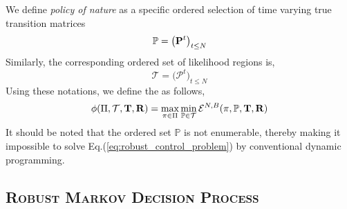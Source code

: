 We define \textit{policy of nature} as a specific ordered selection of time varying true transition matrices 
\begin{equation}
\mathbb{P} = \big( {\mathbf{P}}^t \big)_{t \leq N}
\end{equation}
Similarly, the corresponding ordered set of likelihood regions is,
\begin{equation}
\mathcal{T} = \big(\mathcal{P}^t \big)_{t \leq N}
\end{equation}
Using these notations, we define the {\robustcontrolproblem} as follows,
\begin{equation}
\label{eq:robust_control_problem}
\phi(\Pi, \mathcal{T}, {\mathbf{T}}, {\mathbf{R}}) = \max_{\pi \in \Pi} \min_{\mathbb{P} \in \mathcal{T}} \mathcal{E}^{N,B}(\pi, \mathbb{P}, {\mathbf{T}}, {\mathbf{R}}) \\
\end{equation}
It should be noted that the ordered set $\mathbb{P}$ is not enumerable, thereby making it impossible to solve Eq.(\ref{eq:robust_control_problem}) by conventional dynamic programming.

\subsection{\textsc{Robust Markov Decision Process}}

